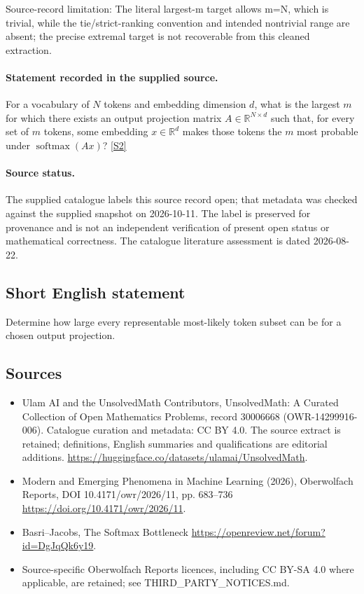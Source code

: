 \documentclass[11pt]{article}
\begin{document}
Source-record limitation: The literal largest-m target allows m=N, which is trivial, while the tie/strict-ranking convention and intended nontrivial range are absent; the precise extremal target is not recoverable from this cleaned extraction.
\paragraph{Statement recorded in the supplied source.}
For a vocabulary of $N$ tokens and embedding dimension $d$, what is the largest $m$ for which there exists an output projection matrix $A\in\mathbb R^{N\times d}$ such that, for every set of $m$ tokens, some embedding $x\in\mathbb R^d$ makes those tokens the $m$ most probable under $\operatorname{softmax}(Ax)$? \href{https://doi.org/10.4171/owr/2026/11}{[S2]}
\paragraph{Source status.}
The supplied catalogue labels this source record open; that metadata was checked against the supplied snapshot on 2026-10-11. The label is preserved for provenance and is not an independent verification of present open status or mathematical correctness. The catalogue literature assessment is dated 2026-08-22.
\subsection{Short English statement}
Determine how large every representable most-likely token subset can be for a chosen output projection.
\subsection{Sources}
\begin{itemize}
\item[S1] Ulam AI and the UnsolvedMath Contributors, UnsolvedMath: A Curated Collection of Open Mathematics Problems, record 30006668 (OWR-14299916-006). Catalogue curation and metadata: CC BY 4.0. The source extract is retained; definitions, English summaries and qualifications are editorial additions.
\url{https://huggingface.co/datasets/ulamai/UnsolvedMath}.
\item[S2] Modern and Emerging Phenomena in Machine Learning (2026), Oberwolfach Reports, DOI 10.4171/owr/2026/11, pp. 683--736
\url{https://doi.org/10.4171/owr/2026/11}.
\item[S3] Basri--Jacobs, The Softmax Bottleneck
\url{https://openreview.net/forum?id=DgJqQk6y19}.
\item Source-specific Oberwolfach Reports licences, including CC BY-SA 4.0 where applicable, are retained; see THIRD\_PARTY\_NOTICES.md.
\end{itemize}
\end{document}
